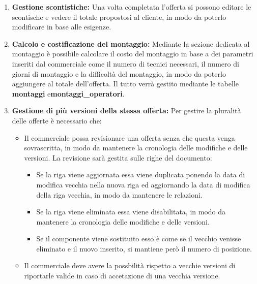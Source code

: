 \documentclass[12pt, a4paper]{article}
\begin{document}
\begin{enumerate}
\begin{itemize}
              \item identificare se il componente è opzionale  o meno, in modo da poterlo calcolare diversamente nel totale dell'offerta.
          \end{itemize}
    \item \textbf{Gestione scontistiche:}
          Una volta completata l'offerta si possono editare le scontische e vedere il totale propostosi al cliente, in modo da poterlo modificare in base alle esigenze.
    \item \textbf{Calcolo e costificazione del montaggio:} Mediante la sezione dedicata al montaggio è possibile calcolare il costo del montaggio in base a dei parametri
          inseriti dal commerciale come il numero di tecnici necessari, il numero di giorni di montaggio e la difficoltà del montaggio, in modo da poterlo
          aggiungere al totale dell'offerta.
          Il tutto verrà gestito mediante le tabelle \textbf{montaggi} e\textbf{montaggi\_operatori}.
    \item{\textbf{Gestione di più versioni della stessa offerta:}}
          Per gestire la pluralità delle offerte è necessario che:
          \begin{itemize}
              \item Il commerciale possa revisionare una offerta senza che questa venga sovrascritta, in modo da mantenere la cronologia delle modifiche e delle versioni.
                    La revisione sarà gestita sulle righe del documento:
                    \begin{itemize}
                        \item Se la riga viene aggiornata essa viene duplicata ponendo la data di modifica vecchia nella nuova riga ed aggiornando
                              la data di modifica della riga vecchia, in modo da mantenere le relazioni.
                        \item Se la riga viene eliminata essa viene disabilitata, in modo da mantenere la cronologia delle modifiche e delle versioni.
                        \item Se il componente viene sostituito esso è come se il vecchio venisse eliminato e il nuovo inserito, si mantiene però il numero di posizione.
                    \end{itemize}
              \item Il commerciale deve avere la possbilità rispetto a vecchie versioni di riportarle valide in caso di accetazione di una vecchia versione.
          \end{itemize}

\end{enumerate}
\end{document}

